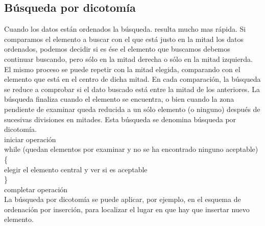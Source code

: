 \documentclass[11pt,a4paper]{article}
\begin{document}
  	\subsection{Búsqueda por dicotomía}
  	Cuando los datos están ordenados la búsqueda. resulta mucho mas rápida.
  	Si comparamos el elemento a buscar con el que está justo en la mitad
  	los datos ordenados, podemos decidir si es ése el elemento que buscamos
  	debemos continuar buscando, pero sólo en la mitad derecha o sólo en la mitad
  	izquierda.
  	El mismo proceso se puede repetir con la mitad elegida, comparando con el
  	elemento que está en el centro de dicha mitad. En cada comparación, la
  	búsqueda se reduce a comprobar si el dato buscado está entre la mitad de
  	los anteriores. La búsqueda finaliza cuando el elemento se encuentra, o bien
  	cuando la zona pendiente de examinar queda reducida a un sólo elemento
  	(o ninguno) después de sucesivas divisiones en mitades. Esta búsqueda se
  	denomina búsqueda por dicotomía.\\
  	iniciar operación\\
  	while (quedan elementos por examinar y no se ha encontrado ninguno aceptable)\{\\
  	elegir el elemento central y ver si es aceptable\\
  	\}\\
  	completar operación\\
  	La búsqueda por dicotomía se puede aplicar, por ejemplo, en el esquema de
  	ordenación por inserción, para localizar el lugar en que hay que insertar nuevo elemento.
\end{document}
